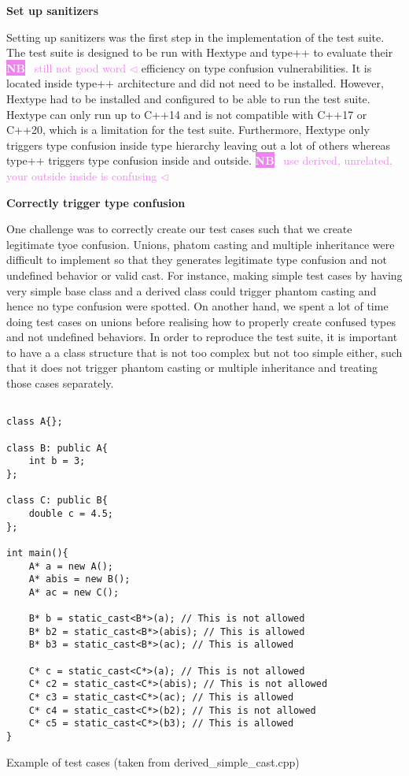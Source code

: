 \documentclass[a4paper,11pt,oneside]{report}
\newcommand{\todobox}[3]{%
       \colorbox{#1}{\textcolor{white}{\sffamily\bfseries\scriptsize #2}}%
       ~\textcolor{#1}{#3} %
       \textcolor{#1}{$\triangleleft$}%
}
\newcommand{\nb}[1]{\todobox{violet}{NB}{#1}}
\begin{document}
\textbf{Set up sanitizers}

\noindent{}Setting up sanitizers was the first step in the implementation of the
test suite.  The test suite is designed to be run with Hextype and type++ to
evaluate their \nb{still not good word} efficiency on type confusion vulnerabilities.  It is located
inside type++ architecture and did not need to be installed. However, Hextype
had to be installed and configured to be able to run the test suite. Hextype can
only run up to C++14 and is not compatible with C++17 or C++20, which is a
limitation for the test suite. Furthermore, Hextype only triggers type confusion
inside type hierarchy leaving out a lot of others whereas type++ triggers type
confusion inside and outside. \nb{use derived, unrelated, your outside inside is confusing}

\textbf{Correctly trigger type confusion}

\noindent{}One challenge was to correctly create our test cases such that we
create legitimate tyoe confusion.  Unions, phatom casting and multiple
inheritance were difficult to implement so that they generates legitimate type
confusion and not undefined behavior or valid cast. For instance, making simple
test cases by having very simple base class and a derived class could trigger
phantom casting and hence no type confusion were spotted. On another hand, we
spent a lot of time doing test cases on unions before realising how to properly
create confused types and not undefined behaviors.  In order to reproduce the
test suite, it is important to have a a class structure that is not too complex
but not too simple either, such that it does not trigger phantom casting or
multiple inheritance and treating those cases separately.

\begin{listing}
       \begin{verbatim}

class A{};

class B: public A{
    int b = 3;
};

class C: public B{
    double c = 4.5;
}; 

int main(){
    A* a = new A();
    A* abis = new B();
    A* ac = new C();

    B* b = static_cast<B*>(a); // This is not allowed
    B* b2 = static_cast<B*>(abis); // This is allowed
    B* b3 = static_cast<B*>(ac); // This is allowed

    C* c = static_cast<C*>(a); // This is not allowed
    C* c2 = static_cast<C*>(abis); // This is not allowed
    C* c3 = static_cast<C*>(ac); // This is allowed
    C* c4 = static_cast<C*>(b2); // This is not allowed
    C* c5 = static_cast<C*>(b3); // This is allowed
}
       \end{verbatim}
       \caption{Example of test cases (taken from derived\_simple\_cast.cpp)}
       \label{lst:test_cases}
\end{listing}
\end{document}
